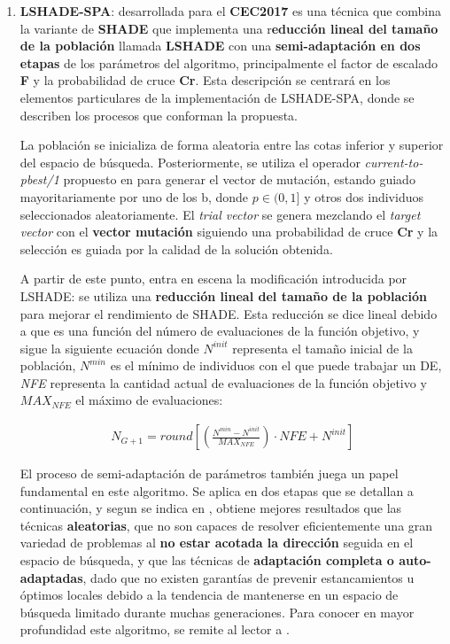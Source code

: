 \begin{enumerate}
	
	\item \textbf{LSHADE-SPA}: desarrollada para el \textbf{CEC2017}\cite{LSHADESPA} es una técnica que combina la variante de \textbf{SHADE}\cite{SHADE} que implementa una r\textbf{educción lineal del tamaño de la población} llamada \textbf{LSHADE}\cite{LSHADE} con una \textbf{semi-adaptación en dos etapas} de los parámetros del algoritmo, principalmente el factor de escalado \textbf{F} y la probabilidad de cruce \textbf{Cr}. Esta descripción se centrará en los elementos particulares de la implementación de LSHADE-SPA, donde se describen los procesos que conforman la propuesta.
	
	La población se inicializa de forma aleatoria entre las cotas inferior y superior del espacio de búsqueda. Posteriormente, se utiliza el operador \textit{current-to-pbest/1} propuesto en \cite{JADE} para generar el vector de mutación, estando guiado mayoritariamente por uno de los b, donde $p\in (0,1]$ y otros dos individuos seleccionados aleatoriamente. El \textit{trial vector} se genera mezclando el \textit{target vector} con el \textbf{vector mutación} siguiendo una probabilidad de cruce \textbf{Cr} y la selección es guiada por la calidad de la solución obtenida.
	
	A partir de este punto, entra en escena la modificación introducida por LSHADE: se utiliza una \textbf{reducción lineal del tamaño de la población} para mejorar el rendimiento de SHADE. Esta reducción se dice lineal debido a que es una función del número de evaluaciones de la función objetivo, y sigue la siguiente ecuación donde $ N^{init}$ representa el tamaño inicial de la población, $ N^{min}$ es el mínimo de individuos con el que puede trabajar un DE, \textit{NFE} representa la cantidad actual de evaluaciones de la función objetivo y $MAX_{NFE}$ el máximo de evaluaciones:
	
	\begin{equation}\label{eq:LPSR}
		\begin{gathered}
			N_{G+1} = round[(\frac{N^{min} - N^{init} }{MAX_{NFE} }) \cdot NFE + N^{init}]
		\end{gathered}
	\end{equation}
	
	El proceso de semi-adaptación de parámetros también juega un papel fundamental en este algoritmo. Se aplica en dos etapas que se detallan a continuación, y segun se indica en \cite{LSHADESPA}, obtiene mejores resultados que las técnicas \textbf{aleatorias}, que no son capaces de resolver eficientemente una gran variedad de problemas al \textbf{no estar acotada la dirección} seguida en el espacio de búsqueda, y que las técnicas de \textbf{adaptación completa o auto-adaptadas}, dado que no existen garantías de prevenir estancamientos u óptimos locales debido a la tendencia de mantenerse en un espacio de búsqueda limitado durante muchas generaciones. Para conocer en mayor profundidad este algoritmo, se remite al lector a \cite{LSHADESPA}.


\end{enumerate}
